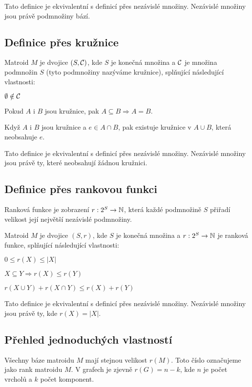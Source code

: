 \poz Tato definice je ekvivalentní s definicí přes nezávislé množiny. Nezávislé
množiny jsou právě podmnožiny bází.

\subsection{Definice přes kružnice}
\df Matroid $M$ je dvojice $(S,\mathcal{C})$, kde $S$ je konečná množina a $\mathcal{C}$ je
množina podmnožin $S$ (tyto podmnožiny nazýváme kružnice), splňující
následující vlastnosti:
\begin{enumerate*}
\item $\emptyset \notin \mathcal{C}$
\item Pokud $A$ i $B$ jsou kružnice, pak $A\subseteq B \Rightarrow A = B$.
\item Když $A$ i $B$ jsou kružnice a $e\in A\cap B$, pak existuje kružnice v $A\cup B$, která neobsahuje $e$.
\end{enumerate*}

\poz Tato definice je ekvivalentní s definicí přes nezávislé množiny. Nezávislé
množiny jsou právě ty, které neobsahují žádnou kružnici.

\subsection{Definice přes rankovou funkci}
\df Ranková funkce je zobrazení $r: 2^S \rightarrow \mathbb{N}$, která každé podmnožině
$S$ přiřadí velikost její největší nezávislé podmnožiny.

\df Matroid $M$ je dvojice $(S,r)$, kde $S$ je konečná množina a $r: 2^S
\rightarrow \mathbb{N}$ je ranková funkce, splňující následující vlastnosti:
\begin{enumerate*}
\item $0 \le r(X) \le |X|$
\item $X\subseteq Y \Rightarrow r(X) \le r(Y)$
\item $r(X\cup Y) + r(X\cap Y) \le r(X) + r(Y)$
\end{enumerate*}

\poz Tato definice je ekvivalentní s definicí přes nezávislé množiny. Nezávislé množiny jsou právě ty, kde $r(X) = |X|$.

\subsection{Přehled jednoduchých vlastností}
\tv Všechny báze matroidu $M$ mají stejnou velikost $r(M)$. Toto číslo
označujeme jako rank matroidu $M$. V grafech je zjevně $r(G) = n-k$, kde $n$ je
počet vrcholů a $k$ počet komponent.

